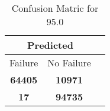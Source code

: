 \begin{table}[] 
\caption{Confusion Matric for 95.0} 
\label{Table: Prediction Accuracy-DMD95.0OnlySunEKF-ignoreReflectionEKF-top2-Reflection} 
\centering 
\begin{tabular} 
 {@{}ccc@{}} 
\toprule 
\multicolumn{2}{c}{\textbf{Predicted}}
 \\ \midrule 
\multicolumn{1}{|c|}{Failure} & 
\multicolumn{1}{c|}{No Failure}
 \\ \midrule 
\multicolumn{1}{|c|}{\color{green}\textbf{64405}} & 
\multicolumn{1}{c|}{\color{red}\textbf{10971}}
 \\ \midrule 
\multicolumn{1}{|c|}{\color{red}\textbf{17}} & 
\multicolumn{1}{c|}{\color{green}\textbf{94735}}
 \\ \bottomrule 
\end{tabular} 
\end{table} 
